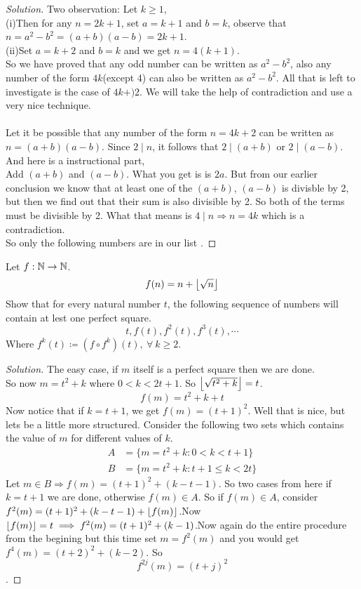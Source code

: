 \documentclass{scrartcl} %
\begin{document}
\begin{proof}[Solution]
Two observation: Let $k \geq 1$,\\ (i)Then for any $n = 2k+1$, set $a = k + 1$ and $b = k$, observe that\\ $n = a^2 - b^2 = \left(a + b\right)\left(a - b\right) = 2k + 1$.\\
(ii)Set $a = k + 2$ and $b = k$ and we get $n = 4\left(k + 1\right)$.\\
So we have proved that any odd number can be written as $a^2 - b^2$, also any number of the form $4k$(except 4) can also be written as $a^2 - b^2$. All that is left to investigate is the case of $4k + )2$. We will take the help of contradiction and use a very nice technique.\\
\\
Let it be possible that any number of the form $n = 4k + 2$ can be written as $n = (a + b)(a - b)$. Since $2 \mid n$, it follows that $2 \mid (a + b)$ or $2 \mid (a - b)$.\\
And here is a instructional part,\\
Add $\left(a+b\right)$ and $\left(a - b\right)$. What you get is is $2a$. But from our earlier conclusion we know that at least one of the $\left(a + b\right)$, $\left(a - b\right)$ is divisble by 2, but then we find out that their sum is also divisible by 2. So both of the terms must be divisible by 2. What that means is $4 \mid n \Rightarrow n = 4k$ which is a contradiction.\\
So only the following numbers are in our list .
\end{proof}

\begin{example}[CMI B4, 2017] 
Let $f : \mathbb N \rightarrow \mathbb N$.
\[ f(n) = n + \left\lfloor \sqrt{n} \right\rfloor\]
Show that for every natural number $t$, the following sequence of numbers will contain at lest one perfect square.
\[
	t, f(t), f^2(t),f^3(t),\cdots
\]
Where $f^k(t) \coloneq \left(f \circ f^k\right)(t), \ \forall\ k\geq2$.
\end{example}
\begin{proof}[Solution]
The easy case, if $m$ itself is a perfect square then we are done.\\
So now $m = t^2 + k$ where $0 < k < 2t + 1$. So $\left\lfloor \sqrt{t^2+k} \right\rfloor = t$.
\[
	f(m) = t^2 + k + t
\]
Now notice that if $k = t + 1$, we get $f(m) = \left(t+1\right)^2$. Well that is nice, but lets be a little more structured.
Consider the following two sets which contains the value of $m$ for different values of $k$.
\begin{align*}
	A &= \{m = t^2 + k : 0 < k < t + 1\}\\
	B &= \{m = t^2 + k : t + 1 \leq k < 2t\}
\end{align*}
Let $m \in B \Rightarrow f(m) = (t + 1)^2 + (k - t - 1)$. So two cases from here if $k = t+1$ we are done, otherwise $f(m) \in A$. So if $f(m) \in A$, consider $f^2(m) = (t+1)^2 + (k - t - 1) + \left\lfloor f(m) \right\rfloor$.Now $\left\lfloor f(m) \right\rfloor = t \implies f^2(m) = (t+1)^2 + (k - 1)$.Now again do the entire procedure from the begining but this time set $m = f^2(m)$ and you would get $f^4(m) = (t + 2)^2 + (k - 2)$. So\[ f^{2j}(m) = (t + j)^2\].
\end{proof}
\end{document}
